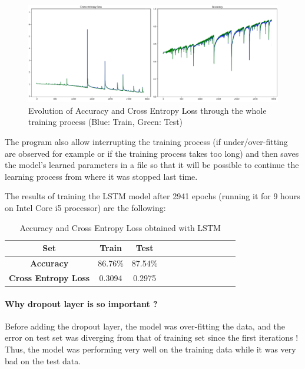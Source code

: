 \documentclass[a4paper,english,12pt]{article}
\begin{document}
\begin{figure}[H]
\centering
\includegraphics[width=\textwidth]{acc_loss}
\caption{Evolution of Accuracy and Cross Entropy Loss through the whole training process (Blue: Train, Green: Test)}
\end{figure}

The program also allow interrupting the training process (if under/over-fitting are observed for example or if the training process takes too long) and then saves the model's learned parameters in a file so that it will be possible to continue the learning process from where it was stopped last time.

The results of training the LSTM model after 2941 epochs (running it for 9 hours on Intel Core i5 processor) are the following:

\begin{table}[H]\centering
	\begin{tabular}{cccccccccccc}
		\toprule
		\textbf{Set} & Train & Test \\    \midrule
		\textbf{Accuracy} & 86.76\% & 87.54\% \\   
		\textbf{Cross Entropy Loss} & 0.3094 & 0.2975\\
		\bottomrule	
	\end{tabular}
	\caption{Accuracy and Cross Entropy Loss obtained with LSTM }
\end{table}


\paragraph{Why dropout layer is so important ?}
Before adding the dropout layer, the model was over-fitting the data, and the error on test set was diverging from that of training set since the first iterations ! Thus, the model was performing very well on the training data while it was very bad on the test data.
\end{document}

